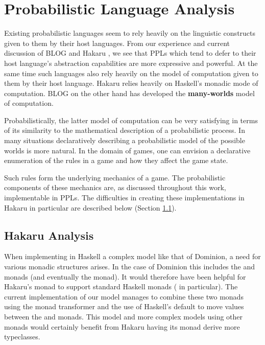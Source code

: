 
\section{Probabilistic Language Analysis} \label{sec:meta-analysis}

Existing probabilistic languages seem to rely heavily on the linguistic
constructs given to them by their host languages. From our experience and
current discussion of BLOG \cite{BlOG} and Hakaru \cite{hakaru}, we see that PPLs
which tend to defer to their host language's abstraction capabilities are more
expressive and powerful. At the same time such languages also rely
heavily on the model of computation given to them by their host language.
Hakaru relies heavily on Haskell's monadic mode of computation. BLOG on
the other hand has developed the {\bf many-worlds} model of computation.

Probabilistically, the latter model of computation can be very satisfying
in terms of its similarity to the mathematical description of a probabilistic
process. In many situations declaratively
describing a probabilistic model of the possible worlds is more natural.
In the domain of games, one can envision a declarative enumeration
of the rules in a game and how they affect the game state.

Such rules form the underlying mechanics of a game. The probabilistic
components of these mechanics are, as discussed throughout this work,
implementable in PPLs. The difficulties in creating these implementations
in Hakaru in particular are described below (Section \ref{sec:hakaru-analysis}).

\subsection{Hakaru Analysis} \label{sec:hakaru-analysis}

When implementing in Haskell a complex model like that of Dominion, a
need for various monadic structures arises. In the case of Dominion
this includes the  and  monads (and eventually
the  monad). It would therefore have been helpful for Hakaru's
 monad to support standard Haskell monads ( in
particular). The current implementation of our model manages to combine
these two monads using the  monad transformer and the use
of Haskell's default  to move values between the  and
 monads. This model and more complex models using other
monads would certainly benefit from Hakaru having its 
monad derive more typeclasses.

